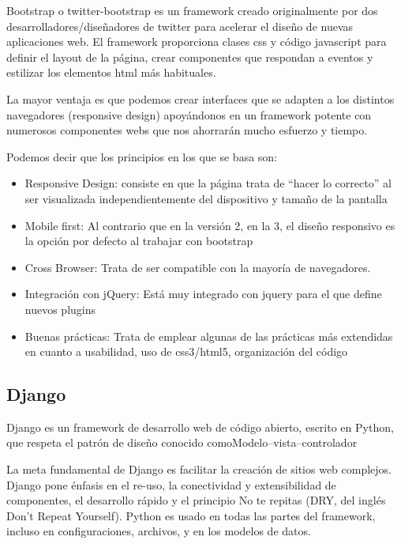Bootstrap o twitter-bootstrap es un framework creado originalmente por dos desarrolladores/diseñadores de twitter para acelerar el diseño de nuevas aplicaciones web.
El framework proporciona clases css y código javascript para definir el layout de la página, crear componentes que respondan a eventos y estilizar los elementos html más habituales.

La mayor ventaja es que podemos crear interfaces que se adapten a los distintos navegadores (responsive design) apoyándonos en un framework potente con numerosos componentes webs que nos ahorrarán mucho esfuerzo y tiempo.

Podemos decir que los principios en los que se basa son:

\begin{itemize}

	\item Responsive Design: consiste en que la página trata de “hacer lo correcto” al ser visualizada independientemente del dispositivo y tamaño de la pantalla
	
	\item Mobile first: Al contrario que en la versión 2, en la 3, el diseño responsivo es la opción por defecto al trabajar con bootstrap

	\item Cross Browser: Trata de ser compatible con la mayoría de navegadores.
	
	\item Integración con jQuery: Está muy integrado con jquery para el que define nuevos plugins

	\item Buenas prácticas: Trata de emplear algunas de las prácticas más extendidas en cuanto a usabilidad, uso de css3/html5, organización del código
	
	
\end{itemize}

\subsection{Django}

Django es un framework de desarrollo web de código abierto, escrito en Python, que respeta el patrón de diseño conocido comoModelo–vista–controlador

La meta fundamental de Django es facilitar la creación de sitios web complejos. Django pone énfasis en el re-uso, la conectividad y extensibilidad de componentes, el desarrollo rápido y el principio No te repitas (DRY, del inglés Don't Repeat Yourself). Python es usado en todas las partes del framework, incluso en configuraciones, archivos, y en los modelos de datos.

